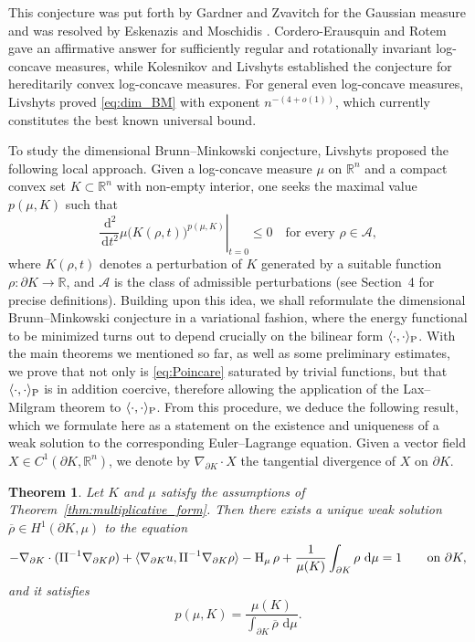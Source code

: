 \documentclass[a4paper, 11pt]{article}
\newtheorem{theorem}{Theorem}[section]
\theoremstyle{definition}
\newcommand{\di}{\, \mathrm{d}}
\begin{document}
This conjecture was put forth by Gardner and Zvavitch for the Gaussian measure
\cite{gardner2010gaussian} and was resolved by Eskenazis and Moschidis \cite{dim_gauss}.
Cordero-Erausquin and Rotem \cite{rot_B} gave an affirmative answer for sufficiently
regular and rotationally invariant log-concave measures, while Kolesnikov and Livshyts \cite{Kol_Liv_Gardner-Zvavitch} established the conjecture for hereditarily
convex log-concave measures. For general even log-concave measures, Livshyts
\cite{GalynaDimensional_BM} proved \eqref{eq:dim_BM} with exponent $n^{-(4+o(1))}$,
which currently constitutes the best known universal bound. 

To study the dimensional Brunn--Minkowski conjecture, Livshyts \cite{GalynaStability} proposed the following local approach. Given a log-concave measure $\mu$ on $\mathbb{R}^n$ and a compact convex set $K \subset \mathbb{R}^n$ with non-empty interior, one seeks the maximal value $p(\mu,K)$ such that
\[\left. \frac{\di^2}{\di t^2} \mu\bigl(K(\rho,t)\bigr)^{p(\mu,K)} \right|_{t=0}\leq 0\quad \text{for every } \rho \in \mathcal{A},\]
where $K(\rho,t)$ denotes a perturbation of $K$ generated by a suitable function $\rho : \partial K \to \mathbb{R}$, and $\mathcal{A}$ is the class of admissible perturbations (see Section~4 for precise definitions). Building upon this idea, we shall reformulate the dimensional Brunn--Minkowski conjecture in a variational fashion, where the energy functional to be minimized turns out to depend crucially on the bilinear form $\langle \cdot, \cdot \rangle_{\rm P}$. With the main theorems we mentioned so far, as well as some preliminary estimates, we prove that not only is \eqref{eq:Poincare} saturated by trivial functions, but that $\langle \cdot, \cdot \rangle_{\rm P}$ is in addition coercive, therefore allowing the application of the Lax--Milgram theorem to $\langle \cdot, \cdot \rangle_{\rm P}$. From this procedure, we deduce the following result, which we formulate here as a statement on the existence and uniqueness of a weak solution to the corresponding Euler--Lagrange equation. Given a vector field
$X \in C^{1}(\partial K,\mathbb{R}^n)$, we denote by
$\nabla_{\partial K} \cdot X$ the tangential divergence of $X$ on $\partial K$.
\begin{theorem}\label{thm:minimal_power}
    Let $K$ and $\mu$ satisfy the assumptions of Theorem~\ref{thm:multiplicative_form}. Then there exists a unique weak solution $\overline{\rho} \in H^{1}(\partial K,\mu)$ to the equation
\begin{equation}\label{eq:PDE_divergence_form_intro}
-\nabla_{\partial K} \cdot ({\rm II}^{-1}\nabla_{\partial K}\rho)+\langle \nabla_{\partial K}u,{\rm II}^{-1}\nabla_{\partial K}{\rho} \rangle -{\rm H}_\mu\,\rho+\frac{1}{\mu(K)}\int_{\partial K}\rho\,\di\mu=1\qquad\text{on }\partial K,
\end{equation}
and it satisfies 
\begin{equation}\label{eq:new_concavity expression_intro}
p(\mu,K) = \frac{\mu(K)}{\int_{\partial K} \overline{\rho}\,\di\mu}.
\end{equation}
\end{theorem}\noindent
\end{document}
